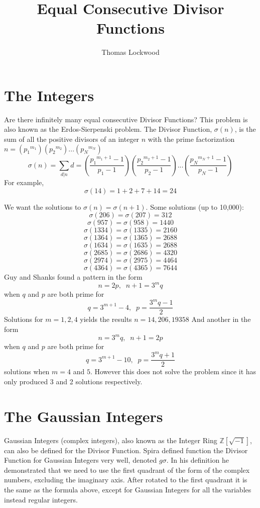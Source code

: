 \documentclass[12pt]{amsart}
\title{Equal Consecutive Divisor Functions}
\author{Thomas Lockwood}
\begin{document}
\maketitle
\thispagestyle{empty}


\section{The Integers}
Are there infinitely many equal consecutive Divisor Functions? This problem is also known as the Erdos-Sierpenski problem. The Divisor Function, $\sigma(n)$, is the sum of all the positive divisors of an integer $n$ with the prime factorization $n = ({p_1}^{m_1})({p_2}^{m_2})...({p_N}^{m_N})$ $$\sigma(n) = \sum_{d|{n}}d = (\frac{{p_1}^{m_1+1} - 1} {{p_1} - 1}) (\frac{{p_2}^{m_2+1} - 1}{{p_2} - 1})... (\frac{{p_N}^{m_N+1} - 1}{{p_N} - 1}) $$ For example, $$\sigma(14) = 1 + 2 + 7 + 14 = 24$$

We want the solutions to $\sigma(n) = \sigma(n+1)$. Some solutions (up to 10,000):
\\
$$\sigma(206) = \sigma(207) = 312$$
$$\sigma(957) = \sigma(958) = 1440$$
$$\sigma(1334) = \sigma(1335) = 2160$$
$$\sigma(1364) = \sigma(1365) = 2688$$
$$\sigma(1634) = \sigma(1635) = 2688$$
$$\sigma(2685) = \sigma(2686) = 4320$$
$$\sigma(2974) = \sigma(2975) = 4464$$
$$\sigma(4364) = \sigma(4365) = 7644$$
Guy and Shanks found a pattern in the form $$n = 2p,\; \; n + 1 = 3^{m}q$$ when $q$ and $p$ are both prime for $$q = 3^{m+1} - 4, \; \; p=\frac{3^{m}q-1} {2}$$ Solutions for $m = 1, 2, 4$ yields the results $n = 14, 206, 19358$
And another in the form $$n = 3^{m}q, \; \; n+1 = 2p$$ when $q$ and $p$ are both prime for $$q = 3^{m+1} - 10, \; \; p = \frac{3^{m}q + 1} {2}$$  solutions when $m = 4$ and $5$. However this does not solve the problem since it has only produced 3 and 2 solutions respectively.

\section{The Gaussian Integers}
Gaussian Integers (complex integers), also known as the Integer Ring $\mathds{Z}[\sqrt{-1}]$, can also be defined for the Divisor Function. Spira defined function the Divisor Function for Gaussian Integers very well, denoted $g\sigma$. In his definition he demonstrated that we need to use the first quadrant of the form of the complex numbers, excluding the imaginary axis. After rotated to the first quadrant it is the same as the formula above, except for Gaussian Integers for all the variables instead regular integers.
\end{document}
